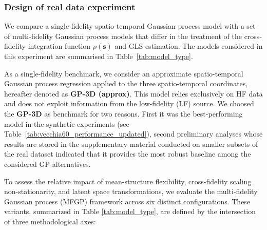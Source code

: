\documentclass[12pt]{article}
\begin{document}
\subsubsection{Design of real data experiment}

We compare a single-fidelity spatio-temporal Gaussian process model with a  set of multi-fidelity Gaussian process  models that differ in the treatment of the cross-fidelity integration function $\rho(\bm{s})$ and GLS estimation. The models considered in this experiment are summarised in Table~\ref{tab:model_type}.

As a single-fidelity benchmark, we consider an approximate spatio-temporal Gaussian process regression applied to the three spatio-temporal coordinates, hereafter 
denoted as \textbf{GP-3D (approx)}. This model relies exclusively on 
HF data and does not exploit information from the low-fidelity (LF) source. We choosed the \textbf{GP-3D} as benchmark for two reasons. First it was the best-performing model in the synthetic experiments 
(see Table~\ref{tab:vecchia60_performance_updated}), second preliminary analyses whose results are stored in the supplementary material conducted on smaller subsets of the real dataset indicated that it provides the most robust  baseline among the considered GP alternatives. 


To assess the relative impact of mean-structure flexibility, cross-fidelity scaling non-stationarity, and latent space transformations, we evaluate the multi-fidelity Gaussian process (MFGP) framework across six distinct configurations. These variants, summarized in Table \ref{tab:model_type}, are defined by the intersection of three methodological axes:
\end{document}
